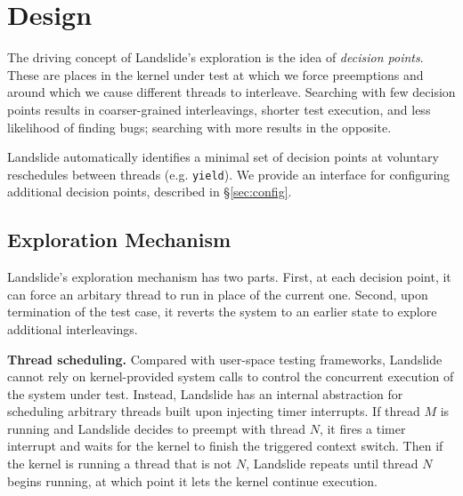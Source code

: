\documentclass{llncs}
\begin{document}


\squish
\section{Design}
\squish
\label{sec:design}

The driving concept of Landslide's exploration is the idea of {\em decision points}. These are places in the kernel under test at which we force preemptions and around which we cause different threads to interleave. Searching with few decision points results in coarser-grained interleavings, shorter test execution, and less likelihood of finding bugs; searching with more results in the opposite.

Landslide automatically identifies a minimal set of decision points at voluntary reschedules between threads (e.g. \texttt{yield}). We provide an interface for configuring additional decision points, described in \S\ref{sec:config}.

\squish
\subsection{Exploration Mechanism}
\squish

Landslide's exploration mechanism has two parts. First, at each decision point, it can force an arbitary thread to run in place of the current one. Second, upon termination of the test case, it reverts the system to an earlier state to explore additional interleavings.

{\bf Thread scheduling.} Compared with user-space testing frameworks, Landslide cannot rely on kernel-provided system calls to control the concurrent execution of the system under test. Instead, Landslide has an internal abstraction for scheduling arbitrary threads built upon injecting timer interrupts.
If thread $M$ is running and Landslide decides to preempt with thread $N$, it fires a timer interrupt and waits for the kernel to finish the triggered context switch. Then if the kernel is running a thread that is not $N$, Landslide repeats until thread $N$ begins running, at which point it lets the kernel continue execution.
\end{document}
